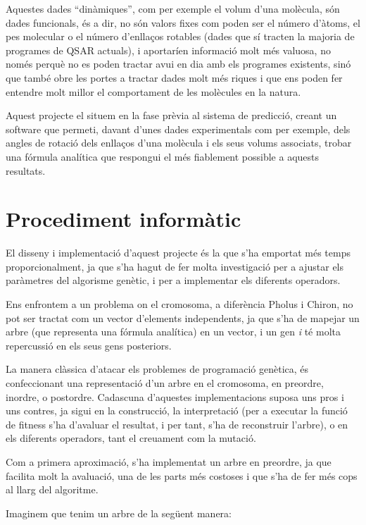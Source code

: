Aquestes dades ``dinàmiques'', com per exemple el volum d'una molècula, són
dades funcionals, és a dir, no són valors fixes com poden ser el número d'àtoms,
el pes molecular o el número d'enllaços rotables (dades que sí tracten la
majoria de programes de QSAR actuals), i aportaríen informació molt més valuosa,
no només perquè no es poden tractar avui en dia amb els programes existents,
sinó que també obre les portes a tractar dades molt més riques i que ens poden
fer entendre molt millor el comportament de les molècules en la natura.

Aquest projecte el situem en la fase prèvia al sistema de predicció,
creant un software que permeti, davant d'unes dades experimentals com per
exemple, dels angles de rotació dels enllaços d'una molècula i els seus volums
associats, trobar una fórmula analítica que respongui el més fiablement possible
a aquests resultats.

\section{Procediment informàtic} %
\label{sec:GProcediment informatic}

El disseny i implementació  d'aquest projecte és la que s'ha emportat més temps
proporcionalment, ja que s'ha hagut de fer molta investigació per a ajustar els
paràmetres del algorisme genètic, i per a implementar els diferents operadors.

Ens enfrontem a un problema on el cromosoma, a diferència Pholus i Chiron, no
pot ser tractat com un vector d'elements independents, ja que s'ha de mapejar un
arbre (que representa una fórmula analítica) en un vector, i un gen
\textit{i} té molta repercussió en els seus gens posteriors.

La manera clàssica d'atacar els problemes de programació genètica, és
confeccionant una representació d'un arbre en el cromosoma, en preordre,
inordre, o postordre.  Cadascuna d'aquestes implementacions suposa uns pros i
uns contres, ja sigui en la construcció, la interpretació (per a executar la
funció de fitness s'ha d'avaluar el resultat, i per tant, s'ha de reconstruir
l'arbre), o en els diferents operadors, tant el creuament com la mutació.

Com a primera aproximació, s'ha implementat un arbre en preordre, ja que facilita
molt la avaluació, una de les parts més costoses i que s'ha de fer més cops al
llarg del algoritme.

Imaginem que tenim un arbre de la següent manera:

